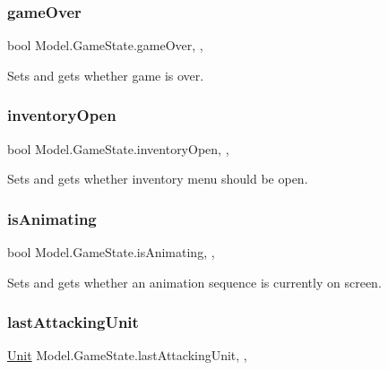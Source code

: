 \subsubsection{\texorpdfstring{game\+Over}{gameOver}}
{\footnotesize\ttfamily bool Model.\+Game\+State.\+game\+Over\hspace{0.3cm}{\ttfamily [static]}, {\ttfamily [get]}, {\ttfamily [set]}}

Sets and gets whether game is over. \hypertarget{class_model_1_1_game_state_ae8b8bcd9dbbed13dc893c5c4319e7435}{}\label{class_model_1_1_game_state_ae8b8bcd9dbbed13dc893c5c4319e7435} 
\subsubsection{\texorpdfstring{inventory\+Open}{inventoryOpen}}
{\footnotesize\ttfamily bool Model.\+Game\+State.\+inventory\+Open\hspace{0.3cm}{\ttfamily [static]}, {\ttfamily [get]}, {\ttfamily [set]}}

Sets and gets whether inventory menu should be open. \hypertarget{class_model_1_1_game_state_ac8c6a53641aafa5d57a9dff8f958a904}{}\label{class_model_1_1_game_state_ac8c6a53641aafa5d57a9dff8f958a904} 
\subsubsection{\texorpdfstring{is\+Animating}{isAnimating}}
{\footnotesize\ttfamily bool Model.\+Game\+State.\+is\+Animating\hspace{0.3cm}{\ttfamily [static]}, {\ttfamily [get]}, {\ttfamily [set]}}

Sets and gets whether an animation sequence is currently on screen. \hypertarget{class_model_1_1_game_state_a1bacc8a1b6e6959dea52d8a6cf7aa831}{}\label{class_model_1_1_game_state_a1bacc8a1b6e6959dea52d8a6cf7aa831} 
\subsubsection{\texorpdfstring{last\+Attacking\+Unit}{lastAttackingUnit}}
{\footnotesize\ttfamily \hyperlink{interface_model_1_1_unit_module_1_1_unit}{Unit} Model.\+Game\+State.\+last\+Attacking\+Unit\hspace{0.3cm}{\ttfamily [static]}, {\ttfamily [get]}, {\ttfamily [set]}}

